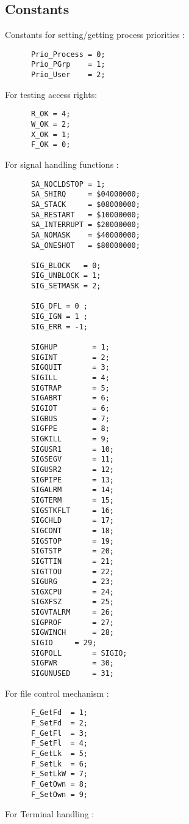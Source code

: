 \subsection{Constants}
Constants for setting/getting process priorities :
\begin{verbatim}
      Prio_Process = 0;
      Prio_PGrp    = 1;
      Prio_User    = 2;
\end{verbatim}
For testing  access rights:
\begin{verbatim}
      R_OK = 4; 
      W_OK = 2;
      X_OK = 1;
      F_OK = 0;
\end{verbatim}
For signal handling functions :
\begin{verbatim}
      SA_NOCLDSTOP = 1;
      SA_SHIRQ	   = $04000000;
      SA_STACK	   = $08000000;      
      SA_RESTART   = $10000000;
      SA_INTERRUPT = $20000000;
      SA_NOMASK	   = $40000000;
      SA_ONESHOT   = $80000000;
      
      SIG_BLOCK	  = 0;
      SIG_UNBLOCK = 1;
      SIG_SETMASK = 2;

      SIG_DFL = 0 ;
      SIG_IGN = 1 ;
      SIG_ERR = -1;
      
      SIGHUP		= 1;
      SIGINT		= 2;
      SIGQUIT		= 3;
      SIGILL		= 4;
      SIGTRAP		= 5;
      SIGABRT		= 6;
      SIGIOT		= 6;
      SIGBUS		= 7;
      SIGFPE		= 8;
      SIGKILL		= 9;
      SIGUSR1		= 10;
      SIGSEGV		= 11;
      SIGUSR2		= 12;
      SIGPIPE		= 13;
      SIGALRM		= 14;
      SIGTERM		= 15;
      SIGSTKFLT		= 16;
      SIGCHLD		= 17;
      SIGCONT		= 18;
      SIGSTOP		= 19;
      SIGTSTP		= 20;
      SIGTTIN		= 21;
      SIGTTOU		= 22;
      SIGURG		= 23;
      SIGXCPU		= 24;
      SIGXFSZ		= 25;
      SIGVTALRM		= 26;
      SIGPROF		= 27;
      SIGWINCH		= 28;
      SIGIO		= 29;
      SIGPOLL		= SIGIO;
      SIGPWR		= 30;
      SIGUNUSED		= 31;
\end{verbatim}
For file control mechanism :
\begin{verbatim}
      F_GetFd  = 1;
      F_SetFd  = 2;
      F_GetFl  = 3;
      F_SetFl  = 4;
      F_GetLk  = 5;
      F_SetLk  = 6;
      F_SetLkW = 7;
      F_GetOwn = 8;
      F_SetOwn = 9;
\end{verbatim}
For Terminal handling :
